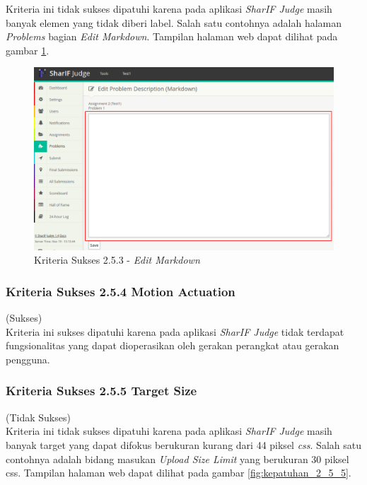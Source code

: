 \documentclass[a4paper,twoside]{article}
\begin{document}
\begin{enumerate}
		Kriteria ini tidak sukses dipatuhi karena pada aplikasi \textit{SharIF Judge} masih banyak elemen yang tidak diberi label. Salah satu contohnya adalah halaman \textit{Problems} bagian \textit{Edit Markdown}. Tampilan halaman web dapat dilihat pada gambar \ref{fig:kepatuhan_2_5_3}.
		
		\begin{figure}[H]
			\centering  
			\includegraphics[scale=0.5]{kepatuhan_2_5_3}  
			\caption[Kriteria Sukses 2.5.3 - \textit{Edit Markdown}]{Kriteria Sukses 2.5.3 - \textit{Edit Markdown}} 
			\label{fig:kepatuhan_2_5_3} 
		\end{figure}
		
		\subsubsection*{Kriteria Sukses 2.5.4 Motion Actuation}
		\label{subsubsec:kepatuhan_kriteria_2.5.4}
		(Sukses) \\
		
		Kriteria ini sukses dipatuhi karena pada aplikasi \textit{SharIF Judge} tidak terdapat fungsionalitas yang dapat dioperasikan oleh gerakan perangkat atau gerakan pengguna.
		
		\subsubsection*{Kriteria Sukses 2.5.5 Target Size}
		\label{subsubsec:kepatuhan_kriteria_2.5.5}
		(Tidak Sukses) \\
		
		Kriteria ini tidak sukses dipatuhi karena pada aplikasi \textit{SharIF Judge} masih banyak target yang dapat difokus berukuran kurang dari 44 piksel \textit{css}. Salah satu contohnya adalah bidang masukan \textit{Upload Size Limit} yang berukuran 30 piksel css. Tampilan halaman web dapat dilihat pada gambar \ref{fig:kepatuhan_2_5_5}.
		

\end{enumerate}
\end{document}
